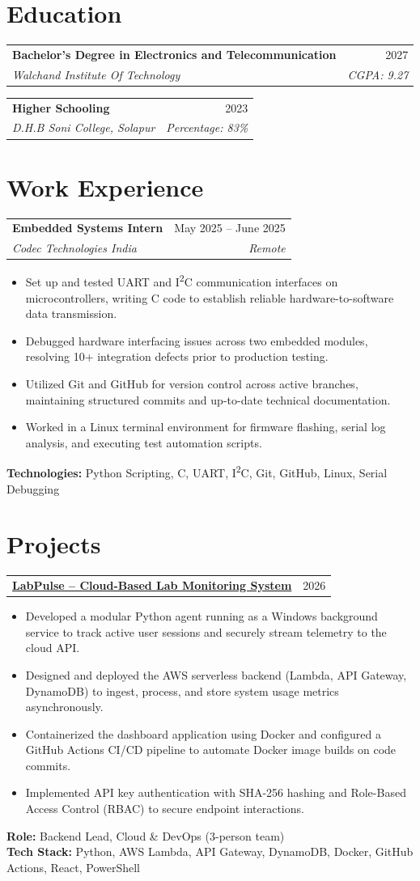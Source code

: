 \documentclass[letterpaper,10pt]{article}
\makeatletter
\newcommand{\resumeItemListStart}{\begin{itemize}[leftmargin=0.18in, topsep=1.5pt, parsep=0pt, itemsep=1pt]}
\newcommand{\resumeItemListEnd}{\end{itemize}\vspace{-4pt}}
\newcommand{\resumeItem}[1]{\item\small{#1}}
\newcommand{\resumeSubheading}[4]{
  \vspace{-1pt}
  \begin{tabular*}{\textwidth}[t]{l@{\extracolsep{\fill}}r}
    \textbf{#1} & #2 \\
    \textit{\small#3} & \textit{\small #4} \\
  \end{tabular*}\vspace{-4pt}
}
\newcommand{\resumeProjectHeading}[2]{
  \vspace{-1pt}
  \begin{tabular*}{\textwidth}[t]{l@{\extracolsep{\fill}}r}
    \textbf{#1} & #2 \\
  \end{tabular*}\vspace{-4pt}
}
\makeatother
\begin{document}
\vspace{-6pt}

\section{Education}
\resumeSubheading
  {Bachelor's Degree in Electronics and Telecommunication}{2027}
  {Walchand Institute Of Technology}{CGPA: 9.27}
\resumeSubheading
  {Higher Schooling}{2023}
  {D.H.B Soni College, Solapur}{Percentage: 83\%}

\vspace{-2pt}

\section{Work Experience}
\resumeSubheading
  {Embedded Systems Intern}{May 2025 -- June 2025}
  {Codec Technologies India}{Remote}
\resumeItemListStart
  \resumeItem{Set up and tested UART and I\textsuperscript{2}C communication interfaces on microcontrollers, writing C code to establish reliable hardware-to-software data transmission.}
  \resumeItem{Debugged hardware interfacing issues across two embedded modules, resolving 10+ integration defects prior to production testing.}
  \resumeItem{Utilized Git and GitHub for version control across active branches, maintaining structured commits and up-to-date technical documentation.}
  \resumeItem{Worked in a Linux terminal environment for firmware flashing, serial log analysis, and executing test automation scripts.}
\resumeItemListEnd
\small{\textbf{Technologies:} Python Scripting, C, UART, I\textsuperscript{2}C, Git, GitHub, Linux, Serial Debugging}

\vspace{-2pt}

\section{Projects}

\resumeProjectHeading
  {\href{https://github.com/AdityaMittha/LabPulse}{\textbf{LabPulse -- Cloud-Based Lab Monitoring System}}}{2026}
\resumeItemListStart
  \resumeItem{Developed a modular Python agent running as a Windows background service to track active user sessions and securely stream telemetry to the cloud API.}
  \resumeItem{Designed and deployed the AWS serverless backend (Lambda, API Gateway, DynamoDB) to ingest, process, and store system usage metrics asynchronously.}
  \resumeItem{Containerized the dashboard application using Docker and configured a GitHub Actions CI/CD pipeline to automate Docker image builds on code commits.}
  \resumeItem{Implemented API key authentication with SHA-256 hashing and Role-Based Access Control (RBAC) to secure endpoint interactions.}
\resumeItemListEnd
\small{\textbf{Role:} Backend Lead, Cloud \& DevOps (3-person team)} \\
\small{\textbf{Tech Stack:} Python, AWS Lambda, API Gateway, DynamoDB, Docker, GitHub Actions, React, PowerShell}
\end{document}

